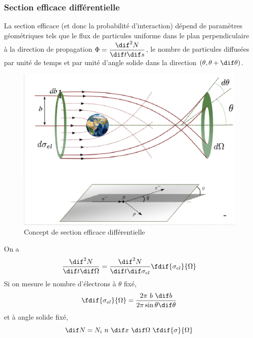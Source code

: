 \subsubsection{Section efficace différentielle}
La section efficace (et donc la probabilité d'interaction) dépend de paramètres géométriques tels que le flux de particules uniforme dans le plan perpendiculaire à la direction de propagation $\Phi=\dfrac{\dif^2N}{\dif t\dif s}$, le nombre de particules diffusées par unité de temps et par unité d'angle solide dans la direction $(\theta, \theta+\dif \theta)$.
\begin{figure}[ht]
    \centering
    \includegraphics[scale=0.75]{Images1/section_efficace_diff.PNG}
    \caption{Concept de section efficace différentielle}
    \label{fig:section_efficace_diff}
\end{figure}
On a
\[
    \dfrac{\dif^2N}{\dif t\dif \Omega}=\dfrac{\dif^2N}{\dif t\dif \sigma_{el}} \fdif{\sigma_{el}}{\Omega}
\]
Si on mesure le nombre d'électrons à $\theta$ fixé,
\[
    \fdif{\sigma_{el}}{\Omega}=\dfrac{2\pi~b~\dif b}{2\pi \sin{\theta}\dif \theta}
\]
et à angle solide fixé,
\[
    \dif N=N_i~n~\dif x~\dif \Omega~\fdif{\sigma}{\Omega}
\]

